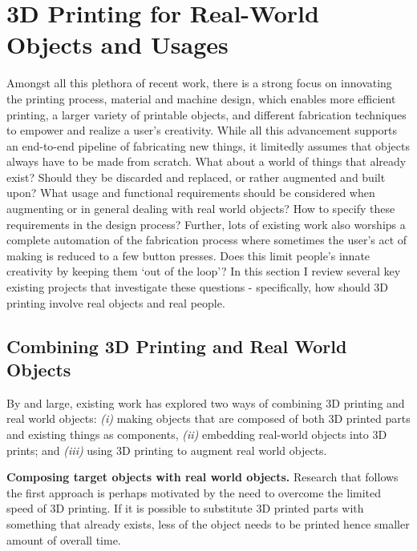 \section{3D Printing for Real-World Objects and Usages}
Amongst all this plethora of recent work, there is a strong focus on innovating the printing process, material and machine design, which enables more efficient printing, a larger variety of printable objects, and different fabrication techniques to empower and realize a user's creativity. While all this advancement supports an end-to-end pipeline of fabricating new things, it limitedly assumes that objects always have to be made from scratch. What about a world of things that already exist? Should they be discarded and replaced, or rather augmented and built upon? What usage and functional requirements should be considered when augmenting or in general dealing with real world objects? How to specify these requirements in the design process? Further, lots of existing work also worships a complete automation of the fabrication process where sometimes the user's act of making is reduced to a few button presses. Does this limit people's innate creativity by keeping them `out of the loop'? In this section I review several key existing projects that investigate these questions - specifically, how should 3D printing involve real objects and real people.


\subsection{Combining 3D Printing and Real World Objects}
By and large, existing work has explored two ways of combining 3D printing and real world objects: {\em (i)} making objects that are composed of both 3D printed parts and existing things as components, {\em (ii)} embedding real-world objects into 3D prints; and {\em (iii)} using 3D printing to augment real world objects.

\textbf{Composing target objects with real world objects.} Research that follows the first approach is perhaps motivated by the need to overcome the limited speed of 3D printing. If it is possible to substitute 3D printed parts with something that already exists, less of the object needs to be printed hence smaller amount of overall time. 

